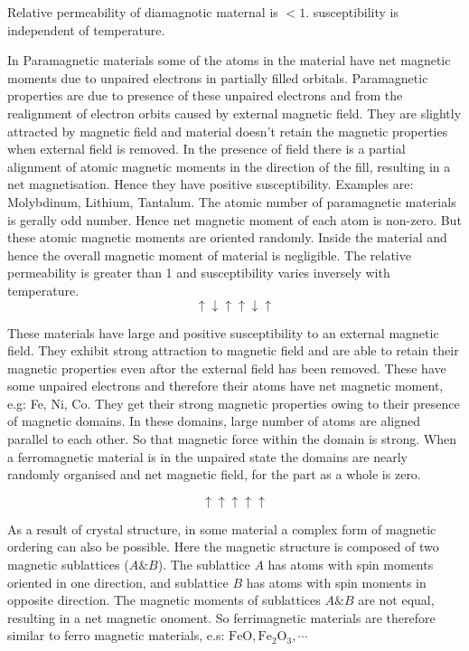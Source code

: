 \documentclass[12pt, a4paper]{article}
\begin{document}
Relative permeability of diamagnotic maternal is $<1$. susceptibility is independent of temperature.

In Paramagnetic materials some of the atoms in the material have net magnetic moments due to unpaired electrons in partially filled orbitals. Paramagnetic properties are due to presence of these unpaired electrons and from the realignment of electron orbits caused by external magnetic field. They are slightly attracted by magnetic field and material doesn't retain the magnetic properties when external field is removed. In the presence of field there is a partial alignment of atomic magnetic moments in the direction of the fill, resulting in a net magnetisation. Hence they have positive susceptibility. Examples are: Molybdinum, Lithium, Tantalum. The atomic number of paramagnetic materials is gerally odd number. Hence net magnetic moment of each atom is non-zero. But these atomic magnetic moments are oriented randomly. Inside the material and hence the overall magnetic moment of material is negligible. The relative permeability is greater than 1 and susceptibility varies inversely with temperature. $$\uparrow \downarrow \uparrow \uparrow \downarrow \uparrow$$

These materials have large and positive susceptibility to an external magnetic field. They exhibit strong attraction to magnetic field and are able to retain their magnetic properties even aftor the external field has been removed. These have some unpaired electrons and therefore their atoms have net magnetic moment, e.g: Fe, Ni, Co. They get their strong magnetic properties owing to their presence of magnetic domains. In these domains, large number of atoms are aligned parallel to each other. So that magnetic force within the domain is strong. When a ferromagnetic material is in the unpaired state the domains are nearly randomly organised and net magnetic field, for the part as a whole is zero.

$$\uparrow \uparrow \uparrow \uparrow \uparrow$$

As a result of crystal structure, in some material a complex form of magnetic ordering can also be possible. Here the magnetic structure is composed of two magnetic sublattices ($A \& B$). The sublattice $A$ has atoms with spin moments oriented in one direction, and sublattice $B$ has atoms with spin moments in opposite direction.
The magnetic moments of sublattices $A \& B$ are not equal, resulting in a net magnetic onoment. So ferrimagnetic materials are therefore similar to ferro magnetic materials, e.s: $\mathrm{FeO}, \mathrm{Fe}_2 \mathrm{O}_3, \cdots$
\end{document}
